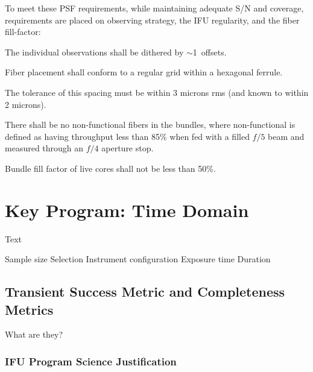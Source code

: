 \documentclass[11pt,a4paper,twoside,onecolumn,openany,final,oldfontcommands]{memoir}
\begin{document}
\medskip

\noindent To meet these PSF requirements, while maintaining adequate S/N and coverage, requirements are placed on observing strategy, the IFU regularity, and the fiber fill-factor:

\begin{requirement}

\reqitem The individual observations shall be dithered by $\sim$1\arcsec\ offsets.

\reqitem Fiber placement shall conform to a regular grid within a hexagonal ferrule.  

\reqitem The tolerance of this spacing must be within 3 microns rms (and known to within 2 microns).

\reqitem There shall be no non-functional fibers in the bundles, where non-functional is defined as having throughput less than 85\% when fed with a filled $f/5$ beam and measured through an $f/4$ aperture stop.

\reqitem Bundle fill factor of live cores shall not be less than 50\%.

\end{requirement}


\chapter{Key Program: Time Domain}\label{prog:timdomain}
Text


\begin{programrequirement}

\reqitem Sample size
\reqitem Selection 
\reqitem Instrument configuration 
\reqitem Exposure time
\reqitem Duration

\end{programrequirement}

\section{Transient Success Metric and Completeness Metrics}

What are they?

\newpage


\subsection{IFU Program Science Justification}
\end{document}

